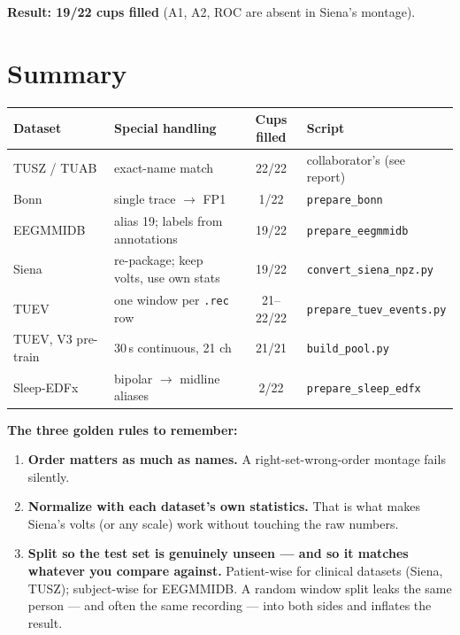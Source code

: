 \documentclass[11pt]{article}
\begin{document}
\textbf{Result: 19/22 cups filled} (A1, A2, ROC are absent in Siena's montage).

\section{Summary}
\begin{center}
\small
\begin{tabular}{@{}llcl@{}}
\toprule
Dataset & Special handling & Cups filled & Script \\
\midrule
TUSZ / TUAB & exact-name match & 22/22 & collaborator's (see report) \\
Bonn        & single trace $\rightarrow$ FP1 & 1/22 & \texttt{prepare\_bonn} \\
EEGMMIDB    & alias 19; labels from annotations & 19/22 & \texttt{prepare\_eegmmidb} \\
Siena       & re-package; keep volts, use own stats & 19/22 & \texttt{convert\_siena\_npz.py} \\
TUEV        & one window per \texttt{.rec} row & 21--22/22 & \texttt{prepare\_tuev\_events.py} \\
TUEV, V3 pre-train & 30\,s continuous, 21 ch & 21/21 & \texttt{build\_pool.py} \\
Sleep-EDFx  & bipolar $\rightarrow$ midline aliases & 2/22 & \texttt{prepare\_sleep\_edfx} \\
\bottomrule
\end{tabular}
\end{center}

\noindent\textbf{The three golden rules to remember:}
\begin{enumerate}[nosep,leftmargin=1.5em]
  \item \textbf{Order matters as much as names.} A right-set-wrong-order montage
  fails silently.
  \item \textbf{Normalize with each dataset's own statistics.} That is what makes
  Siena's volts (or any scale) work without touching the raw numbers.
  \item \textbf{Split so the test set is genuinely unseen ---
  and so it matches whatever you compare against.} Patient-wise for clinical
  datasets (Siena, TUSZ); subject-wise for EEGMMIDB. A random window split leaks
  the same person --- and often the same recording --- into both sides and
  inflates the result.
\end{enumerate}
\end{document}
